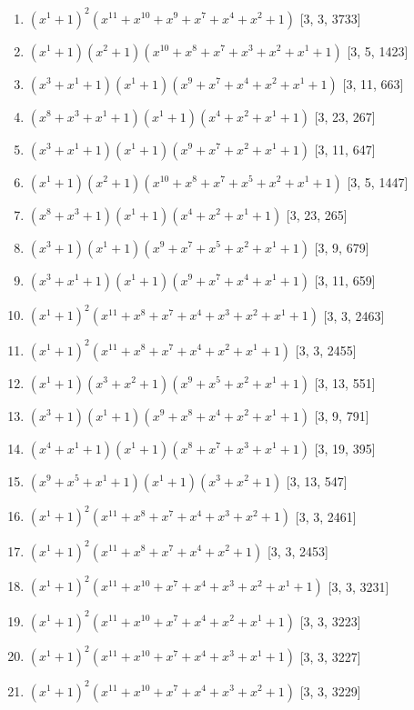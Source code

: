 \documentclass[10pt,twocolumn]{article}
\begin{document}
\begin{enumerate}
\item $(x^{1} + 1)^{2}(x^{11} + x^{10} + x^{9} + x^{7} + x^{4} + x^{2} + 1)$  [3, 3, 3733]
\item $(x^{1} + 1)(x^{2} + 1)(x^{10} + x^{8} + x^{7} + x^{3} + x^{2} + x^{1} + 1)$  [3, 5, 1423]
\item $(x^{3} + x^{1} + 1)(x^{1} + 1)(x^{9} + x^{7} + x^{4} + x^{2} + x^{1} + 1)$  [3, 11, 663]
\item $(x^{8} + x^{3} + x^{1} + 1)(x^{1} + 1)(x^{4} + x^{2} + x^{1} + 1)$  [3, 23, 267]
\item $(x^{3} + x^{1} + 1)(x^{1} + 1)(x^{9} + x^{7} + x^{2} + x^{1} + 1)$  [3, 11, 647]
\item $(x^{1} + 1)(x^{2} + 1)(x^{10} + x^{8} + x^{7} + x^{5} + x^{2} + x^{1} + 1)$  [3, 5, 1447]
\item $(x^{8} + x^{3} + 1)(x^{1} + 1)(x^{4} + x^{2} + x^{1} + 1)$  [3, 23, 265]
\item $(x^{3} + 1)(x^{1} + 1)(x^{9} + x^{7} + x^{5} + x^{2} + x^{1} + 1)$  [3, 9, 679]
\item $(x^{3} + x^{1} + 1)(x^{1} + 1)(x^{9} + x^{7} + x^{4} + x^{1} + 1)$  [3, 11, 659]
\item $(x^{1} + 1)^{2}(x^{11} + x^{8} + x^{7} + x^{4} + x^{3} + x^{2} + x^{1} + 1)$  [3, 3, 2463]
\item $(x^{1} + 1)^{2}(x^{11} + x^{8} + x^{7} + x^{4} + x^{2} + x^{1} + 1)$  [3, 3, 2455]
\item $(x^{1} + 1)(x^{3} + x^{2} + 1)(x^{9} + x^{5} + x^{2} + x^{1} + 1)$  [3, 13, 551]
\item $(x^{3} + 1)(x^{1} + 1)(x^{9} + x^{8} + x^{4} + x^{2} + x^{1} + 1)$  [3, 9, 791]
\item $(x^{4} + x^{1} + 1)(x^{1} + 1)(x^{8} + x^{7} + x^{3} + x^{1} + 1)$  [3, 19, 395]
\item $(x^{9} + x^{5} + x^{1} + 1)(x^{1} + 1)(x^{3} + x^{2} + 1)$  [3, 13, 547]
\item $(x^{1} + 1)^{2}(x^{11} + x^{8} + x^{7} + x^{4} + x^{3} + x^{2} + 1)$  [3, 3, 2461]
\item $(x^{1} + 1)^{2}(x^{11} + x^{8} + x^{7} + x^{4} + x^{2} + 1)$  [3, 3, 2453]
\item $(x^{1} + 1)^{2}(x^{11} + x^{10} + x^{7} + x^{4} + x^{3} + x^{2} + x^{1} + 1)$  [3, 3, 3231]
\item $(x^{1} + 1)^{2}(x^{11} + x^{10} + x^{7} + x^{4} + x^{2} + x^{1} + 1)$  [3, 3, 3223]
\item $(x^{1} + 1)^{2}(x^{11} + x^{10} + x^{7} + x^{4} + x^{3} + x^{1} + 1)$  [3, 3, 3227]
\item $(x^{1} + 1)^{2}(x^{11} + x^{10} + x^{7} + x^{4} + x^{3} + x^{2} + 1)$  [3, 3, 3229]

\end{enumerate}
\end{document}
